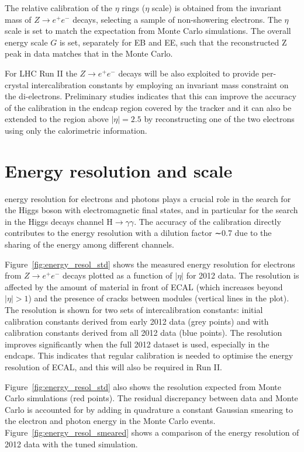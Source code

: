 \documentclass[journal]{IEEEtran}
\begin{document}
The relative calibration of the $\eta$ rings ($\eta$ scale) is obtained from the invariant mass of $Z\to e^+e^-$ decays, selecting a sample of non-showering electrons. The $\eta$ scale is set to match the expectation from Monte Carlo simulations. The overall energy scale $G$ is set, separately for EB and EE, such that the reconstructed Z peak in data matches that in the Monte Carlo.

For LHC Run II the $Z\to e^+e^-$ decays will be also exploited to provide per-crystal intercalibration constants by employing an invariant mass constraint on the di-electrons. Preliminary studies indicates that this can improve the accuracy of the calibration in the endcap region covered by the tracker and it can also be extended to the region above $\vert\eta\vert=2.5$ by reconstructing one of the two electrons using only the calorimetric information. 



\section{Energy resolution and scale}
 energy resolution for electrons and photons plays a crucial role in the search for the Higgs boson with electromagnetic final states, and in particular for the search in the Higgs decays channel H$\to\gamma\gamma$. The accuracy of the calibration directly contributes to the energy resolution with a dilution factor ∼0.7 due to the sharing of the energy among different channels. 

Figure~\ref{fig:energy_resol_std} shows the measured energy resolution for electrons from $Z\to e^+e^-$ decays plotted as a function of $\vert\eta\vert$ for 2012 data. The resolution is affected by the amount of material in front of ECAL (which increases beyond $\vert\eta\vert>1$) and the presence of cracks between modules (vertical lines in the plot). The resolution is shown for two sets of intercalibration constants: initial calibration constants derived from early 2012 data (grey points) and with calibration constants derived from all 2012 data (blue points). The resolution improves significantly when the full 2012 dataset is used, especially in the endcaps. This indicates that regular calibration is needed to optimise the energy resolution of ECAL, and this will also be required in Run II.

Figure~\ref{fig:energy_resol_std} also shows the resolution expected from Monte Carlo simulations (red points). The residual discrepancy between data and Monte Carlo is accounted for by adding in quadrature a constant Gaussian smearing to the electron and photon energy in the Monte Carlo events. Figure~\ref{fig:energy_resol_smeared} shows a comparison of the energy resolution of 2012 data with the tuned simulation.
\end{document}
